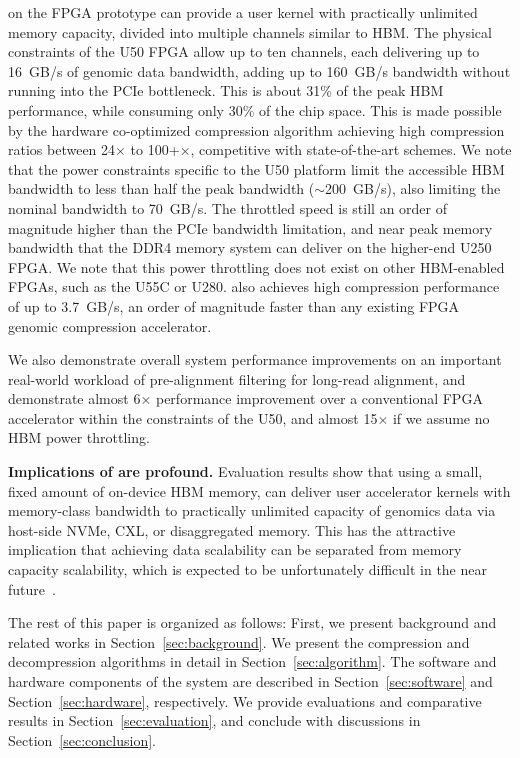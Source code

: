 \name{} on the FPGA prototype can provide a user kernel with practically unlimited memory capacity, divided into multiple channels similar to HBM.
The physical constraints of the U50 FPGA allow up to ten channels, each delivering up to 16~GB/s of genomic data bandwidth, adding up to 160~GB/s bandwidth without running into the PCIe bottleneck.
This is about 31\% of the peak HBM performance, while consuming only 30\% of the chip space.
This is made possible by the hardware co-optimized compression algorithm achieving high compression ratios between 24$\times$ to 100+$\times$, competitive with state-of-the-art schemes.
We note that the power constraints specific to the U50 platform limit the accessible HBM bandwidth to less than half the peak bandwidth ($\sim$200~GB/s), also limiting the nominal \name{} bandwidth to 70~GB/s.
The throttled speed is still an order of magnitude higher than the PCIe bandwidth limitation, and near peak memory bandwidth that the DDR4 memory system can deliver on the higher-end U250 FPGA.
We note that this power throttling does not exist on other HBM-enabled FPGAs, such as the U55C or U280.
\name{} also achieves high compression performance of up to 3.7~GB/s, an order of magnitude faster than any existing FPGA genomic compression accelerator.

We also demonstrate overall system performance improvements on an important real-world workload of pre-alignment filtering for long-read alignment, and demonstrate almost 6$\times$ performance improvement over a conventional FPGA accelerator within the constraints of the U50, and almost 15$\times$ if we assume no HBM power throttling.

\textbf{Implications of \name{} are profound.}
Evaluation results show that using a small, fixed amount of on-device HBM memory, \name{} can deliver user accelerator kernels with memory-class bandwidth to practically unlimited capacity of genomics data via host-side NVMe, CXL, or disaggregated memory.
This has the attractive implication that achieving data scalability can be separated from memory capacity scalability, which is expected to be unfortunately difficult in the near future~\cite{kim2015architectural,shiratake2020scaling,kim2024present,hyun2024pathfinding}.

The rest of this paper is organized as follows:
First, we present background and related works in Section~\ref{sec:background}.
We present the \name{} compression and decompression algorithms in detail in Section~\ref{sec:algorithm}.
The software and hardware components of the \name{} system are described in Section~\ref{sec:software} and Section~\ref{sec:hardware}, respectively.
We provide evaluations and comparative results in Section~\ref{sec:evaluation}, and conclude with discussions in Section~\ref{sec:conclusion}.


